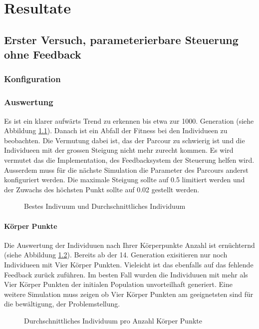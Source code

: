 %
%


\chapter{Resultate\label{chap:Resulate}}

\section{Erster Versuch, parameterierbare Steuerung ohne Feedback}

  \subsection{Konfiguration}
      

  \subsection{Auswertung}
    Es ist ein klarer aufwärts Trend zu erkennen bis etwa zur 1000. Generation (siehe Abbildung \ref{fig:graph}).
    Danach ist ein Abfall der Fitness bei den Individueen zu beobachten.
    Die Vermutung dabei ist, das der Parcour zu schwierig ist und die Individueen
    mit der grossen Steigung nicht mehr zurecht kommen. Es wird vermutet das die Implementation,
    des Feedbacksystem der Steuerung helfen wird. Ausserdem muss für die nächste Simulation
    die Parameter des Parcours anderst konfiguriert werden.
    Die maximale Steigung sollte auf 0.5 limitiert werden und der Zuwachs des höchsten Punkt
    sollte auf 0.02 gestellt werden.
      \begin{figure}
        
        \caption{Bestes Indivuum und Durchschnittliches Individuum}
        \label{fig:graph}
      \end{figure}

  \subsubsection{Körper Punkte}
    Die Auswertung der Individuuen nach Ihrer Körperpunkte Anzahl ist ernüchternd (siehe Abbildung \ref{fig:graphBp}).
    Bereits ab der 14. Generation exisitieren nur noch Individueen mit Vier Körper Punkten.
    Vieleicht ist das ebenfalls auf das fehlende Feedback zurück zuführen. Im besten Fall
    wurden die Individuuen mit mehr als Vier Körper Punkten der initialen Population unvorteilhaft generiert.
    Eine weitere Simulation muss zeigen ob Vier Körper Punkten am geeignetsten sind für die bewältigung,
    der Problemstellung.
  \begin{figure}
    
    \caption{Durchschnittliches Individuum pro Anzahl Körper Punkte}
    \label{fig:graphBp}
  \end{figure}
